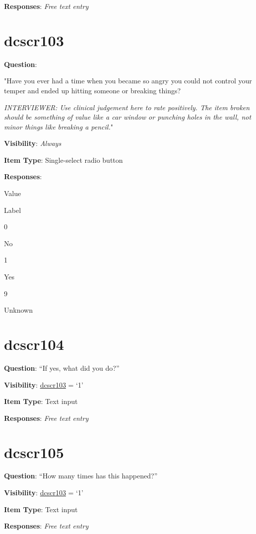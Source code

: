 \documentclass[]{book}
\begin{document}
\textbf{Responses}: \emph{Free text entry}

\hypertarget{dcscr103}{%
\section{dcscr103}\label{dcscr103}}

\textbf{Question}:

"Have you ever had a time when you became so angry you could not control your temper and ended up hitting someone or breaking things?

\emph{INTERVIEWER: Use clinical judgement here to rate positively. The item broken should be something of value like a car window or punching holes in the wall, not minor things like breaking a pencil.}"

\textbf{Visibility}: \emph{Always}

\textbf{Item Type}: Single-select radio button

\textbf{Responses}:

Value

Label

0

No

1

Yes

9

Unknown

\hypertarget{dcscr104}{%
\section{dcscr104}\label{dcscr104}}

\textbf{Question}: ``If yes, what did you do?''

\textbf{Visibility}: \protect\hyperlink{dcscr103}{dcscr103} = `1'

\textbf{Item Type}: Text input

\textbf{Responses}: \emph{Free text entry}

\hypertarget{dcscr105}{%
\section{dcscr105}\label{dcscr105}}

\textbf{Question}: ``How many times has this happened?''

\textbf{Visibility}: \protect\hyperlink{dcscr103}{dcscr103} = `1'

\textbf{Item Type}: Text input

\textbf{Responses}: \emph{Free text entry}
\end{document}
